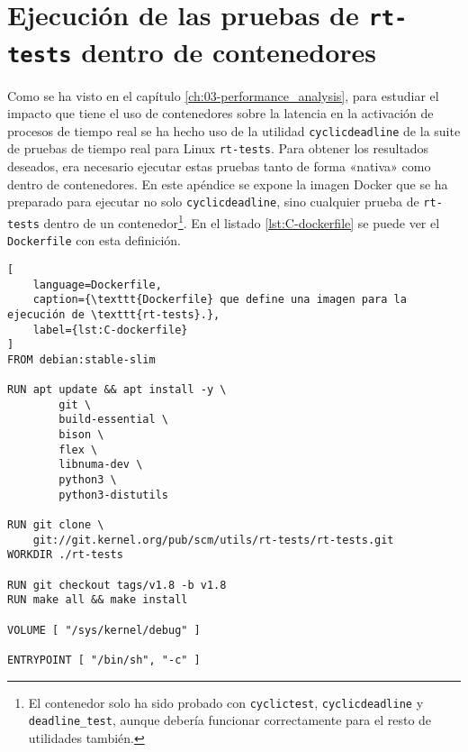 \chapter{Ejecución de las pruebas de \texttt{rt-tests} dentro de contenedores}
\label{app:C-container_tests}

Como se ha visto en el capítulo \ref{ch:03-performance_analysis}, para estudiar
el impacto que tiene el uso de contenedores sobre la latencia en la activación
de procesos de tiempo real se ha hecho uso de la utilidad
\texttt{cyclicdeadline} de la suite de pruebas de tiempo real para Linux
\texttt{rt-tests}. Para obtener los resultados deseados, era necesario ejecutar
estas pruebas tanto de forma «nativa» como dentro de contenedores. En este
apéndice se expone la imagen Docker que se ha preparado para ejecutar no solo
\texttt{cyclicdeadline}, sino cualquier prueba de \texttt{rt-tests} dentro de un
contenedor\footnote{El contenedor solo ha sido probado con \texttt{cyclictest},
    \texttt{cyclicdeadline} y \texttt{deadline\_test}, aunque debería funcionar
    correctamente para el resto de utilidades también.}. En el listado
\ref{lst:C-dockerfile} se puede ver el \texttt{Dockerfile} con esta definición.

\begin{lstlisting}[
    language=Dockerfile,
    caption={\texttt{Dockerfile} que define una imagen para la ejecución de \texttt{rt-tests}.},
    label={lst:C-dockerfile}
]
FROM debian:stable-slim

RUN apt update && apt install -y \
        git \
        build-essential \
        bison \
        flex \
        libnuma-dev \
        python3 \
        python3-distutils

RUN git clone \
    git://git.kernel.org/pub/scm/utils/rt-tests/rt-tests.git
WORKDIR ./rt-tests

RUN git checkout tags/v1.8 -b v1.8
RUN make all && make install

VOLUME [ "/sys/kernel/debug" ]

ENTRYPOINT [ "/bin/sh", "-c" ]
\end{lstlisting}


